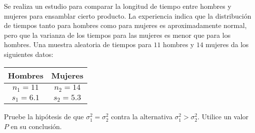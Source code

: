 \begin{enunciado}
 Se realiza un estudio para comparar la longitud de tiempo entre hombres
 y mujeres para ensamblar cierto producto.
 La experiencia indica que la distribuci\'on de tiempos tanto para hombres
 como para mujeres es aproximadamente normal,
 pero que la varianza de los tiempos para las mujeres es menor
 que para los hombres.
 Una muestra aleatoria de tiempos para $11$ hombres y $14$ mujeres da los siguientes datos:
 \begin{center}
  \begin{tabular}{cc}
   \textbf{Hombres} & \textbf{Mujeres} \\
   \hline 
   $n_1 = 11$  & $n_2 = 14$ \\
   $s_1 = 6.1$ & $s_2 = 5.3$
  \end{tabular}
 \end{center}
 Pruebe la hip\'otesis de que $\sigma_1^2 = \sigma_2^2$ contra la alternativa
 $\sigma_1^2 > \sigma_2^2$.
 Utilice un valor $P$ en su conclusi\'on.
\end{enunciado}

